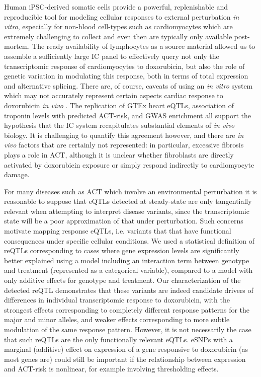 \documentclass{article}
\begin{document}
Human iPSC-derived somatic cells provide a powerful, replenishable and reproducible tool for modeling cellular responses to external perturbation \emph{in vitro}, especially for non-blood cell-types such as cardiomyocytes which are extremely challenging to collect and even then are typically only available post-mortem. 
The ready availability of lymphocytes as a source material allowed us to assemble a sufficiently large IC panel to effectively query not only the transcriptomic response of cardiomyocytes to doxorubicin, but also the role of genetic variation in modulating this response, both in terms of total expression and alternative splicing. 
There are, of course, caveats of using an \emph{in vitro} system which may not accurately represent certain aspects cardiac response to doxorubicin \emph{in vivo} . 
The replication of GTEx heart eQTLs, association of troponin levels with predicted ACT-risk, and GWAS enrichment all support the hypothesis that the IC system recapitulates substantial elements of \emph{in vivo} biology. 
It is challenging to quantify this agreement however, and there are \emph{in vivo} factors that are certainly not represented: in particular, excessive fibrosis plays a role in ACT\cite{cascales2013association,zhan2016ataxia,farhad2016characterization}, although it is unclear whether fibroblasts are directly activated by doxorubicin exposure or simply respond indirectly to cardiomyocyte damage. 

For many diseases such as ACT which involve an environmental perturbation it is reasonable to suppose that eQTLs detected at steady-state are only tangentially relevant when attempting to interpret disease variants, since the transcriptomic state will be a poor approximation of that under perturbation. 
Such concerns motivate mapping response eQTLs, i.e. variants that that have functional consequences under specific cellular conditions.
We used a statistical definition of reQTLs corresponding to cases where gene expression levels are significantly better explained using a model including an interaction term between genotype and treatment (represented as a categorical variable), compared to a model with only additive effects for genotype and treatment. 
Our characterization of the detected reQTL demonstrates that these variants are indeed candidate drivers of differences in individual transcriptomic response to doxorubicin, with the strongest effects corresponding to completely different response patterns for the major and minor alleles, and weaker effects corresponding to more subtle modulation of the same response pattern. 
However, it is not necessarily the case that such reQTLs are the only functionally relevant eQTLs. eSNPs with a marginal (additive) effect on expression of a gene responsive to doxorubicin (as most genes are) could still be important if the relationship between expression and ACT-risk is nonlinear, for example involving thresholding effects. 
\end{document}
